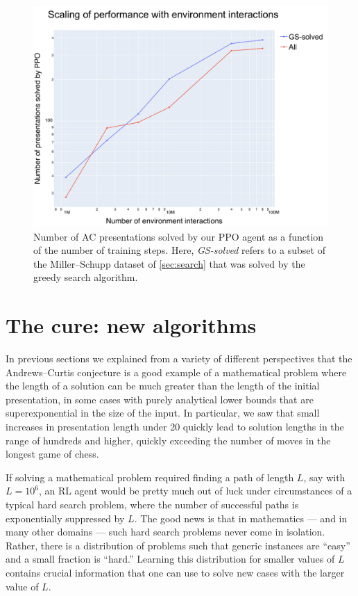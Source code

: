 
\begin{figure}
	\centering
	\includegraphics[scale=0.35]{fig/scaling_env.pdf}
	\caption{Number of AC presentations solved by our PPO agent as a function of the number of training steps. Here, \textit{GS-solved} refers to a subset of the Miller--Schupp dataset of \cref{sec:search} that was solved by the greedy search algorithm.}
	\label{fig:scaling_env}
\end{figure}


\section{The cure: new algorithms}\label{sec:algo}

In previous sections we explained from a variety of different perspectives that the Andrews--Curtis conjecture is a good example of a mathematical problem where the length of a solution can be much greater than the length of the initial presentation, in some cases with purely analytical lower bounds that are superexponential in the size of the input. In particular, we saw that small increases in presentation length under 20 quickly lead to solution lengths in the range of hundreds and higher, quickly exceeding the number of moves in the longest game of chess.

If solving a mathematical problem required finding a path of length $L$, say with $L=10^6$, an RL agent would be pretty much out of luck under circumstances of a typical hard search problem, where the number of successful paths is exponentially suppressed by $L$. The good news is that in mathematics --- and in many other domains --- such hard search problems never come in isolation. Rather, there is a distribution of problems such that generic instances are ``easy'' and a small fraction is ``hard.'' Learning this distribution for smaller values of $L$ contains crucial information that one can use to solve new cases with the larger value of $L$.

